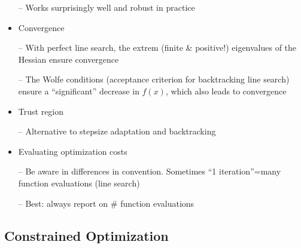 \begin{itemize}
-- Works surprisingly well and robust in practice

\item Convergence

-- With perfect line search, the extrem (finite \& positive!) eigenvalues of the
Hessian ensure convergence

-- The Wolfe conditions (acceptance criterion for backtracking line
search) ensure a ``significant'' decrease in $f(x)$, which also leads
to convergence

\item Trust region

-- Alternative to stepsize adaptation and backtracking

\item Evaluating optimization costs

-- Be aware in differences in convention. Sometimes ``1
iteration''=many function evaluations (line search)

-- Best: always report on \# function evaluations

\end{itemize}


\subsection{Constrained Optimization}


